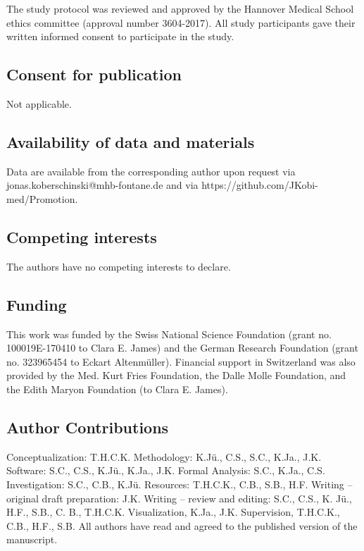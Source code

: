 \documentclass[
  letterpaper,
  DIV=11,
  numbers=noendperiod]{scrartcl}
\begin{document}
The study protocol was reviewed and approved by the Hannover Medical
School ethics committee (approval number 3604-2017). All study
participants gave their written informed consent to participate in the
study.

\subsection{Consent for publication}\label{consent-for-publication}

Not applicable.

\subsection{Availability of data and
materials}\label{availability-of-data-and-materials}

Data are available from the corresponding author upon request via
jonas.koberschinski@mhb-fontane.de and via
https://github.com/JKobi-med/Promotion.

\subsection{Competing interests}\label{competing-interests}

The authors have no competing interests to declare.

\subsection{Funding}\label{funding}

This work was funded by the Swiss National Science Foundation (grant no.
100019E-170410 to Clara E. James) and the German Research Foundation
(grant no. 323965454 to Eckart Altenmüller). Financial support in
Switzerland was also provided by the Med. Kurt Fries Foundation, the
Dalle Molle Foundation, and the Edith Maryon Foundation (to Clara E.
James).

\subsection{Author Contributions}\label{author-contributions}

Conceptualization: T.H.C.K. Methodology: K.Jü., C.S., S.C., K.Ja., J.K.
Software: S.C., C.S., K.Jü., K.Ja., J.K. Formal Analysis: S.C., K.Ja.,
C.S. Investigation: S.C., C.B., K.Jü. Resources: T.H.C.K., C.B., S.B.,
H.F. Writing -- original draft preparation: J.K. Writing -- review and
editing: S.C., C.S., K. Jü., H.F., S.B., C. B., T.H.C.K. Visualization,
K.Ja., J.K. Supervision, T.H.C.K., C.B., H.F., S.B. All authors have
read and agreed to the published version of the manuscript.
\end{document}
